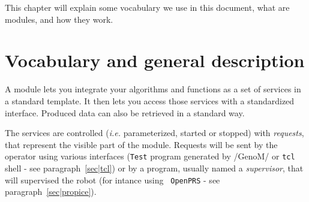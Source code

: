 %
%
%
%
%
%
%

This chapter will explain some vocabulary we use in this document, what
are modules, and how they work.


\section{Vocabulary and general description}
\label{sec|module|voc}

A module lets  you integrate your  algorithms and functions  as  a set of
services in a  standard template. It then lets  you access those services
with a standardized  interface. Produced data can  also be retrieved in a
standard way.

The services are controlled ({\em  i.e.} parameterized, started or stopped)
with  {\em   requests},  that  represent  the    visible  part   of   the
module. Requests  will be sent by the operator using various interfaces
({\tt  Test} program  generated   by /GenoM/ or  {\tt  tcl}  shell  - see 
paragraph~\vref{sec|tcl})    or  by a  program,    usually  named a  {\em
supervisor},  that  will supervised  the  robot  (for  intance using {\tt
OpenPRS} - see paragraph~\vref{sec|propice}).
 

